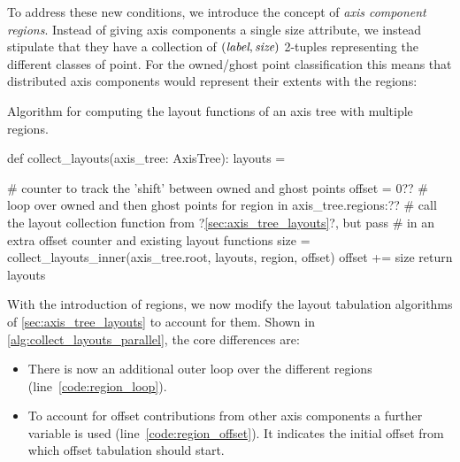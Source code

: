 \documentclass[thesis]{subfiles}
\begin{document}
To address these new conditions, we introduce the concept of \emph{axis component regions}.
Instead of giving axis components a single size attribute, we instead stipulate that they have a collection of $(\textnormal{\it label}, \textnormal{\it size})$ 2-tuples representing the different classes of point.
For the owned/ghost point classification this means that distributed axis components would represent their extents with the regions:
\begin{pyinline}
\end{pyinline}

\begin{algorithm}
  \caption{
    Algorithm for computing the layout functions of an axis tree with multiple regions.
  }
  \begin{center}
    \begin{minipage}{.9\textwidth}
      \begin{pyalg2}
        def collect_layouts(axis_tree: AxisTree):
          layouts = {}

          # counter to track the 'shift' between owned and ghost points
          offset = 0?\label{code:region_offset}?
          # loop over owned and then ghost points
          for region in axis_tree.regions:?\label{code:region_loop}?
            # call the layout collection function from ?\cref{sec:axis_tree_layouts}?, but pass
            # in an extra offset counter and existing layout functions
            size = collect_layouts_inner(axis_tree.root, layouts,
                                         region, offset)
            offset += size
          return layouts
      \end{pyalg2}
    \end{minipage}
  \end{center}
  \label{alg:collect_layouts_parallel}
\end{algorithm}

With the introduction of regions, we now modify the layout tabulation algorithms of \cref{sec:axis_tree_layouts} to account for them.
Shown in \cref{alg:collect_layouts_parallel}, the core differences are:
\begin{itemize}
  \item
    There is now an additional outer loop over the different regions (line~\ref{code:region_loop}).
  \item
    To account for offset contributions from other axis components a further  variable is used (line~\ref{code:region_offset}).
    It indicates the initial offset from which offset tabulation should start.
\end{itemize}
\end{document}
